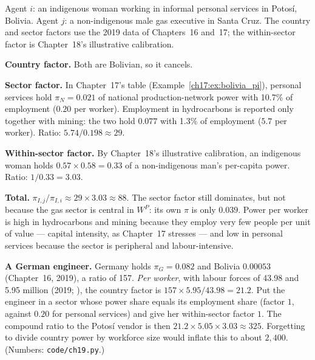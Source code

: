\documentclass[../structural_economics_book.tex]{subfiles}
\begin{document}
\begin{example}\label{ch19:ex:potosi}
Agent $i$: an indigenous woman working in informal personal services in Potos\'{i}, Bolivia. Agent $j$: a non-indigenous male gas executive in Santa Cruz. The country and sector factors use the 2019 data of Chapters~16 and~17; the within-sector factor is Chapter~18's illustrative calibration.

\textbf{Country factor.} Both are Bolivian, so it cancels.

\textbf{Sector factor.} In Chapter~17's table (Example~\ref{ch17:ex:bolivia_pi}), personal services hold $\pi_N = 0.021$ of national production-network power with 10.7\% of employment ($0.20$ per worker). Employment in hydrocarbons is reported only together with mining: the two hold $0.077$ with 1.3\% of employment ($5.7$ per worker). Ratio: $5.74/0.198 \approx 29$.

\textbf{Within-sector factor.} By Chapter~18's illustrative calibration, an indigenous woman holds $0.57 \times 0.58 = 0.33$ of a non-indigenous man's per-capita power. Ratio: $1/0.33 = 3.03$.

\textbf{Total.} $\pi_{I,j}/\pi_{I,i} \approx 29 \times 3.03 \approx 88$. The sector factor still dominates, but not because the gas sector is central in $W^P$: its own $\pi$ is only $0.039$. Power per worker is high in hydrocarbons and mining because they employ very few people per unit of value --- capital intensity, as Chapter~17 stresses --- and low in personal services because the sector is peripheral and labour-intensive.

\textbf{A German engineer.} Germany holds $\pi_G = 0.082$ and Bolivia $0.00053$ (Chapter~16, 2019), a ratio of 157. \emph{Per worker}, with labour forces of 43.98 and 5.95 million (2019; \citealp{worldbank2026wdi}), the country factor is $157 \times 5.95/43.98 = 21.2$. Put the engineer in a sector whose power share equals its employment share (factor $1$, against $0.20$ for personal services) and give her within-sector factor $1$. The compound ratio to the Potos\'{i} vendor is then $21.2 \times 5.05 \times 3.03 \approx 325$. Forgetting to divide country power by workforce size would inflate this to about $2{,}400$. (Numbers: \texttt{code/ch19.py}.)
\end{example}
\end{document}

